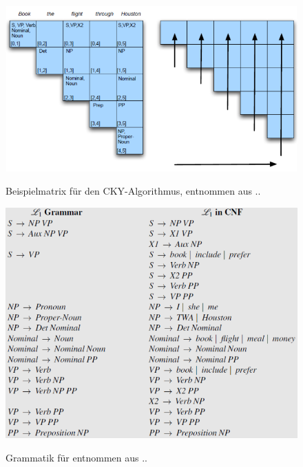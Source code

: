 \begin{figure} [h]
\includegraphics[width=\textwidth]{gfx/cky-beispiel.png} 
\label{fig:cky-beispiel}	
\caption{Beispielmatrix für den CKY-Algorithmus, entnommen aus .. %
}	
\end{figure}

\begin{figure} [h]
\includegraphics[width=\textwidth]{gfx/grammatik-cky-beispiel.png} 
\label{fig:cky-beispiel}	
\caption{Grammatik für  entnommen aus .. %
}	
\end{figure}

